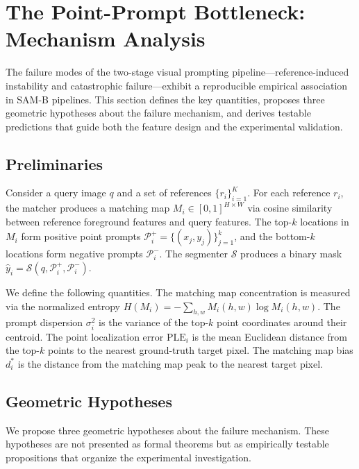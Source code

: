 \documentclass[11pt]{article}
\begin{document}
\section{The Point-Prompt Bottleneck: Mechanism Analysis}
\label{sec:theory}

The failure modes of the two-stage visual prompting pipeline---reference-induced
instability and catastrophic failure---exhibit a reproducible empirical
association in SAM-B pipelines. This section defines the key quantities,
proposes three geometric hypotheses about the failure mechanism, and derives
testable predictions that guide both the feature design and the experimental
validation.

\subsection{Preliminaries}

Consider a query image $q$ and a set of references $\{r_i\}_{i=1}^K$. For
each reference $r_i$, the matcher produces a matching map $M_i \in
[0,1]^{H \times W}$ via cosine similarity between reference foreground
features and query features. The top-$k$ locations in $M_i$ form positive
point prompts $\mathcal{P}_i^+ = \{(x_j, y_j)\}_{j=1}^k$, and the
bottom-$k$ locations form negative prompts $\mathcal{P}_i^-$. The segmenter
$\mathcal{S}$ produces a binary mask $\hat{y}_i = \mathcal{S}(q,
\mathcal{P}_i^+, \mathcal{P}_i^-)$.

We define the following quantities. The matching map concentration is
measured via the normalized entropy $H(M_i) = -\sum_{h,w} M_i(h,w) \log
M_i(h,w)$. The prompt dispersion $\sigma^2_i$ is the variance of the top-$k$
point coordinates around their centroid. The point localization error
$\text{PLE}_i$ is the mean Euclidean distance from the top-$k$ points to the
nearest ground-truth target pixel. The matching map bias $d^*_i$ is the
distance from the matching map peak to the nearest target pixel.

\subsection{Geometric Hypotheses}

We propose three geometric hypotheses about the failure mechanism. These
hypotheses are not presented as formal theorems but as empirically testable
propositions that organize the experimental investigation.
\end{document}
